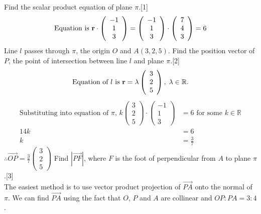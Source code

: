 \documentclass[12pt, a4 paper]{article}
\begin{document}
\begin{outline}[enumerate]
					\color{black}
					\2 Find the scalar product equation of plane $\pi $.\hfill[1]
					\color{blue}
					\[{\textrm{Equation is }}{\bf{r}} \cdot \left( {\begin{array}{*{20}{c}}{ - 1}\\1\\3\end{array}} \right) = \left( {\begin{array}{*{20}{c}}{ - 1}\\1\\3\end{array}} \right) \cdot \left( {\begin{array}{*{20}{c}}7\\4\\3\end{array}} \right) = 6\]
					\color{black}
					\2 Line ${l}$ passes through $\pi $, the origin $O$ and $A(3,2,5)$. Find the position vector of $P$, the point of intersection between line ${l}$ and plane $\pi $.\hfill[2]
					\color{blue}
					\[{\textrm{Equation of }}l{\textrm{ is }}{\bf{r}} = \lambda \left( {\begin{array}{*{20}{c}}3\\2\\5\end{array}} \right),\;\lambda  \in \mathbb{R}.\]
					\begin{align*}
						{\textrm{Substituting into equation of }}\pi {\textrm{, }}k\left( {\begin{array}{*{20}{c}}3 \\2\\5\end{array}} \right) \cdot \left( {\begin{array}{*{20}{c}}{ - 1}\\1\\3\end{array}} \right) &= 6{\textrm{ for some }}k \in \mathbb{R}\\14k &= 6\\k &= \frac{3}{7}
					\end{align*}
					$\therefore \overrightarrow {OP}  = \frac{3}{7}\left( {\begin{array}{*{20}{c}}3\\2\\5\end{array}} \right)$
					\color{black}
					\2 Find $\left| {\overrightarrow {PF} } \right|$, where $F$ is the foot of perpendicular from $A$ to plane $\pi $.\hfill[3]
					\color{blue}
					\\The easiest method is to use vector product projection of $\overrightarrow{PA}$ onto the normal of $\pi$. We can find $\overrightarrow{PA}$ using the fact that $O$, $P$ and $A$ are collinear and $OP:PA = 3:4$.

\end{outline}
\end{document}
